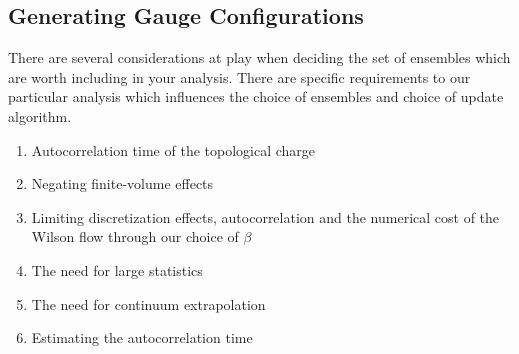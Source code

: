 \documentclass[a4paper,10pt]{article}
\begin{document}
\subsection{Generating Gauge Configurations}
There are several considerations at play when deciding the set of ensembles which are worth including in your analysis. There are specific requirements to our particular analysis which influences the choice of ensembles and choice of update algorithm.
\begin{enumerate}
\item Autocorrelation time of the topological charge
\item Negating finite-volume effects
\item Limiting discretization effects, autocorrelation and the numerical cost of the Wilson flow through our choice of $\beta$
\item The need for large statistics
\item The need for continuum extrapolation
\item Estimating the autocorrelation time
\end{enumerate}
\end{document}

